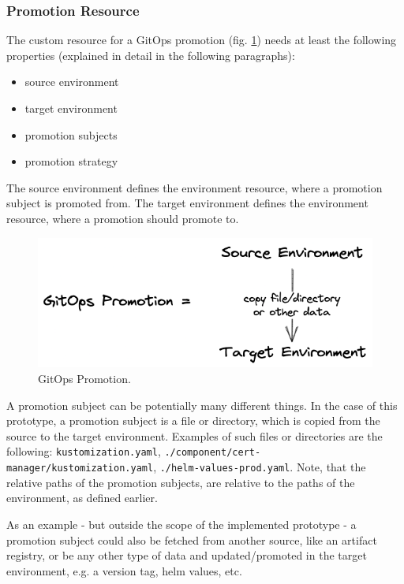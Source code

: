 \subsubsection*{Promotion Resource}

The custom resource for a GitOps promotion
(fig. \ref{fig:gitops-promo})
needs at least the following properties (explained in detail in the following paragraphs):

\begin{itemize}
	\item source environment
	\item target environment
	\item promotion subjects
	\item promotion strategy
\end{itemize}

The source environment defines the environment resource,
where a promotion subject is promoted from.
The target environment defines the environment resource,
where a promotion should promote to.

\begin{figure}[h]
	\centering
	\includegraphics[width=0.70\linewidth]{assets/gitops-promo.png}
	\caption{GitOps Promotion.
	}
	\label{fig:gitops-promo}	
\end{figure}

A promotion subject can be potentially many different things.
In the case of this prototype,
a promotion subject is a file or directory,
which is copied from the source to the target environment.
Examples of such files or directories are the following:
\lstinline|kustomization.yaml|,
\lstinline|./component/cert-manager/kustomization.yaml|,
\lstinline|./helm-values-prod.yaml|.
Note, that the relative paths of the promotion subjects,
are relative to the paths of the environment, as defined earlier.

As an example - but outside the scope of the implemented prototype -
a promotion subject could also be fetched from another source,
like an artifact registry, or be any other type of data
and updated/promoted in the target environment,
e.g. a version tag, helm values, etc.

